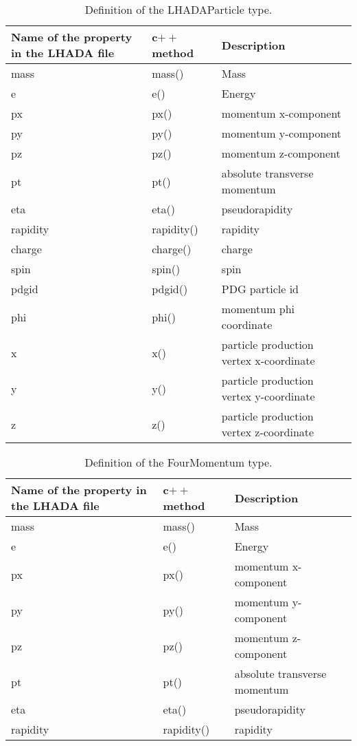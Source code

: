 \documentclass[11pt]{cernrep}
\begin{document}
\begin{table}
  \caption{Definition of the LHADAParticle type. \label{tab:part}}
  \begin{tabular}{l|l|l}
    Name of the property in the LHADA file & c$++$ method & Description \\
    \hline
    mass        & mass() & Mass\\
    e           & e()    & Energy\\
    px          & px()   & momentum x-component\\
    py          & py()   & momentum y-component\\
    pz          & pz()   & momentum z-component\\
    pt          & pt()   & absolute transverse momentum\\
    eta         & eta()  & pseudorapidity\\
    rapidity    & rapidity() & rapidity\\
    charge      & charge() & charge\\
    spin        & spin() & spin\\
    pdgid       & pdgid() & PDG particle id\\
    phi         & phi()   & momentum phi coordinate\\
    x           & x()     & particle production vertex x-coordinate\\
    y           & y()     & particle production vertex y-coordinate\\
    z           & z()     & particle production vertex z-coordinate  \\
  \end{tabular}
\end{table}


\begin{table}
  \caption{Definition of the FourMomentum type. \label{tab:mom}}
  \begin{tabular}{l|l|l}
    Name of the property in the LHADA file & c$++$ method & Description \\
    \hline
    mass 	& mass()     & Mass\\
    e 	        & e()        & Energy\\
    px 	        & px()       & momentum x-component\\
    py 	        & py()       & momentum y-component\\
    pz 	        & pz()       & momentum z-component\\
    pt 	        & pt()       & absolute transverse momentum\\
    eta         & eta()      & pseudorapidity\\
    rapidity    & rapidity() & rapidity\\
  \end{tabular}
\end{table}
\end{document}
